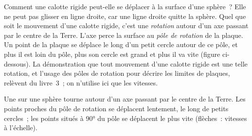 Comment une calotte rigide peut-elle se déplacer à la surface d'une
sphère~? Elle ne peut pas glisser en ligne droite, car une ligne droite
quitte la sphère. Quel que soit le mouvement d'une calotte rigide, c'est une
\emph{rotation} autour d'un axe passant par le centre de la Terre. L'axe
perce la surface au \emph{pôle de rotation} de la plaque. Un point de la
plaque se déplace le long d'un petit cercle autour de ce pôle, et plus il
est loin du pôle, plus son cercle est grand et plus il va vite (figure
ci-dessous). La démonstration que tout mouvement d'une calotte rigide est
une telle rotation, et l'usage des pôles de rotation pour décrire les
limites de plaques, relèvent du livre~3~; on n'utilise ici que les vitesses.

\begin{omfigure}

{\small Une  sur une sphère tourne autour d'un axe passant par
le centre de la Terre. Les points proches du pôle de rotation se déplacent
lentement, le long de petits cercles~; les points situés à \ang{90} du pôle
se déplacent le plus vite (flèches~: vitesses à l'échelle).}
\end{omfigure}

